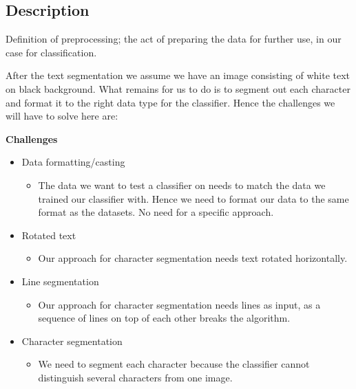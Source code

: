 \documentclass[Report.tex]{subfiles}
\begin{document}
\subsection{Description}
Definition of preprocessing; the act of preparing the data for further use,
in our case for classification. \par
After the text segmentation we assume we have an image consisting of white text on black background. What remains for us to do is to segment out each character and format it to the right data type for the classifier. Hence the challenges we will have to solve here are:


\begin{flushleft}
  \textbf{Challenges}
  \begin{itemize}
    \item{Data formatting/casting}
    \begin{itemize}
      \item{The data we want to test a classifier on needs to match the data we trained our classifier with. Hence we need to format our data to the same format as the datasets. No need for a specific approach.}
    \end{itemize}
    \item{Rotated text}
    \begin{itemize}
      \item{Our approach for character segmentation needs text rotated horizontally.}
    \end{itemize}
      \item{Line segmentation}
    \begin{itemize}
      \item{Our approach for character segmentation needs lines as input, as a sequence of lines on top of each other breaks the algorithm.}
    \end{itemize}
      \item{Character segmentation}
    \begin{itemize}
      \item{We need to segment each character because the classifier cannot distinguish several characters from one image.}
    \end{itemize}
  \end{itemize}
\end{flushleft}
\end{document}
